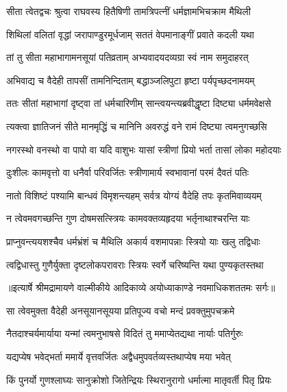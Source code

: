 \twolineshloka
{सीता त्वेतद्वचः श्रुत्वा राघवस्य हितैषिणी}
{तामत्रिपत्नीं धर्मज्ञामभिचक्राम मैथिली} %

\twolineshloka
{शिथिलां वलितां वृद्धां जरापाण्डुरमूर्धजाम्}
{सततं वेपमानाङ्गीं प्रवाते कदली यथा} %

\twolineshloka
{तां तु सीता महाभागामनसूयां पतिव्रताम्}
{अभ्यवादयदव्यग्रा स्वं नाम समुदाहरत्} %

\twolineshloka
{अभिवाद्य च वैदेही तापसीं तामनिन्दिताम्}
{बद्धाञ्जलिपुटा हृष्टा पर्यपृच्छदनामयम्} %

\twolineshloka
{ततः सीतां महाभागां दृष्ट्वा तां धर्मचारिणीम्}
{सान्त्वयन्त्यब्रवीद्धृष्टा दिष्ट्या धर्ममवेक्षसे} %

\twolineshloka
{त्यक्त्वा ज्ञातिजनं सीते मानमृद्धिं च मानिनि}
{अवरुद्धं वने रामं दिष्ट्या त्वमनुगच्छसि} %

\twolineshloka
{नगरस्थो वनस्थो वा पापो वा यदि वाशुभः}
{यासां स्त्रीणां प्रियो भर्ता तासां लोका महोदयाः} %

\twolineshloka
{दुःशीलः कामवृत्तो वा धनैर्वा परिवर्जितः}
{स्त्रीणामार्य स्वभावानां परमं दैवतं पतिः} %

\twolineshloka
{नातो विशिष्टं पश्यामि बान्धवं विमृशन्त्यहम्}
{सर्वत्र योग्यं वैदेहि तपः कृतमिवाव्ययम्} %

\twolineshloka
{न त्वेवमवगच्छन्ति गुण दोषमसत्स्त्रियः}
{कामवक्तव्यहृदया भर्तृनाथाश्चरन्ति याः} %

\twolineshloka
{प्राप्नुवन्त्ययशश्चैव धर्मभ्रंशं च मैथिलि}
{अकार्य वशमापन्नाः स्त्रियो याः खलु तद्विधाः} %

\twolineshloka
{त्वद्विधास्तु गुणैर्युक्ता दृष्टलोकपरावराः}
{स्त्रियः स्वर्गे चरिष्यन्ति यथा पुण्यकृतस्तथा} %


{॥इत्यार्षे श्रीमद्रामायणे वाल्मीकीये आदिकाव्ये अयोध्याकाण्डे नवमाधिकशततमः सर्गः॥}


\twolineshloka
{सा त्वेवमुक्ता वैदेही अनसूयानसूयया}
{प्रतिपूज्य वचो मन्दं प्रवक्तुमुपचक्रमे} %

\twolineshloka
{नैतदाश्चर्यमार्याया यन्मां त्वमनुभाषसे}
{विदितं तु ममाप्येतद्यथा नार्याः पतिर्गुरुः} %

\twolineshloka
{यद्यप्येष भवेद्भर्ता ममार्ये वृत्तवर्जितः}
{अद्वैधमुपवर्तव्यस्तथाप्येष मया भवेत्} %

\twolineshloka
{किं पुनर्यो गुणश्लाघ्यः सानुक्रोशो जितेन्द्रियः}
{स्थिरानुरागो धर्मात्मा मातृवर्ती पितृ प्रियः} %

